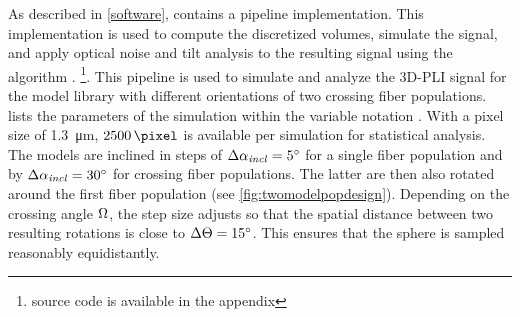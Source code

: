 % 
% 
%
As described in \cref{software}, \fastpli{} contains a pipeline implementation.
This implementation is used to compute the discretized volumes, simulate the signal, and apply optical noise and tilt analysis to the resulting signal using the algorithm \rofl{}. \footnote{source code is available in the appendix \dummy{}}.
This pipeline is used to simulate and analyze the \ac{3D-PLI} signal for the model library with different orientations of two crossing fiber populations.
 lists the parameters of the simulation within the variable notation \fastpli{}.
With a pixel size of \SI{1.3}{\micro\meter}, $\SI{2500}{\pixel}$ is available per simulation for statistical analysis.
The models are inclined in steps of $\Delta \textnormal{$\alpha_{\mathit{incl}}$} = \SI{5}{\degree}$ for a single fiber population and by $\Delta \textnormal{$\alpha_{\mathit{incl}}$} = \SI{30}{\degree}$ for crossing fiber populations. The latter are then also rotated around the first fiber population (see \cref{fig:twomodelpopdesign}). Depending on the crossing angle $\textnormal{$\Omega$}$, the step size adjusts so that the spatial distance between two resulting rotations is close to $\Delta \textnormal{$\Theta$} = \SI{15}{\degree}$.
This ensures that the sphere is sampled reasonably equidistantly.
% 
% 
% 
